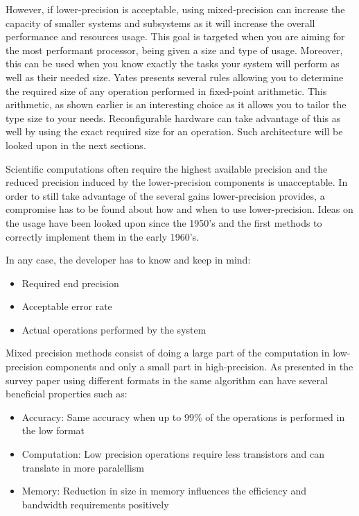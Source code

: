 However, if lower-precision is acceptable, using mixed-precision can increase the capacity of smaller systems and subsystems as it will increase the overall performance and resources usage. This goal is targeted when you are aiming for the most performant processor, being given a size and type of usage. Moreover, this can be used when you know exactly the tasks your system will perform as well as their needed size. Yates \cite{Yates2007} presents several rules allowing you to determine the required size of any operation performed in fixed-point arithmetic. This arithmetic, as shown earlier is an interesting choice as it allows you to tailor the type size to your needs. Reconfigurable hardware can take advantage of this as well by using the exact required size for an operation. Such architecture will be looked upon in the next sections.

Scientific computations often require the highest available precision and the reduced precision induced by the lower-precision components is unacceptable. In order to still take advantage of the several gains lower-precision provides, a compromise has to be found about how and when to use lower-precision. Ideas on the usage have been looked upon since the 1950's and the first methods to correctly implement them in the early 1960's.

In any case, the developer has to know and keep in mind:
\begin{itemize}
  \item Required end precision
  \item Acceptable error rate
  \item Actual operations performed by the system
\end{itemize}

Mixed precision methods consist of doing a large part of the computation in low-precision components and only a small part in high-precision. As presented in the survey paper \cite{Goddeke2007} using different formats in the same algorithm can have several beneficial properties such as:
\begin{itemize}
  \item Accuracy: Same accuracy when up to 99\% of the operations is performed in the low format
  \item Computation: Low precision operations require less transistors and can translate in more paralellism
  \item Memory: Reduction in size in memory influences the efficiency and bandwidth requirements positively
\end{itemize}

